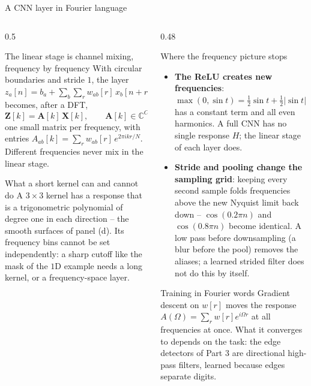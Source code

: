\documentclass[10pt,aspectratio=169]{beamer}
\begin{document}
\begin{frame}{A CNN layer in Fourier language}
\scriptsize
\begin{columns}[T]
\begin{column}{0.5\textwidth}
\begin{block}{The linear stage is channel mixing, frequency by frequency}
With circular boundaries and stride $1$, the layer
$z_a[n]=b_a+\sum_b\sum_rw_{ab}[r]\,x_b[n+r]$ becomes, after a DFT,
\[
  \bm{Z}[k]=\bm{A}[k]\,\bm{X}[k],\qquad
  \bm{A}[k]\in\mathbb{C}^{C_{\mathrm{out}}\times C_{\mathrm{in}}},
\]
one small matrix per frequency, with entries
$A_{ab}[k]=\sum_rw_{ab}[r]\,e^{2\pi ikr/N}$.  Different frequencies never
mix in the linear stage.
\end{block}
\begin{block}{What a short kernel can and cannot do}
A $3\times3$ kernel has a response that is a trigonometric polynomial of
degree one in each direction -- the smooth surfaces of panel (d).  Its
frequency bins cannot be set independently: a sharp cutoff like the mask
of the $1$D example needs a long kernel, or a frequency-space layer.
\end{block}
\end{column}
\begin{column}{0.48\textwidth}
\begin{block}{Where the frequency picture stops}
\begin{itemize}
  \item \textbf{The ReLU creates new frequencies}:
        $\max(0,\sin t)=\tfrac12\sin t+\tfrac12|\sin t|$ has a constant
        term and all even harmonics.  A full CNN has no single response
        $H$; the linear stage of each layer does.
  \item \textbf{Stride and pooling change the sampling grid}: keeping
        every second sample folds frequencies above the new Nyquist limit
        back down -- $\cos(0.2\pi n)$ and $\cos(0.8\pi n)$ become
        identical.  A low pass before downsampling (a blur before the
        pool) removes the aliases; a learned strided filter does not do
        this by itself.
\end{itemize}
\end{block}
\begin{block}{Training in Fourier words}
Gradient descent on $w[r]$ moves the response
$A(\Omega)=\sum_rw[r]e^{i\Omega r}$ at all frequencies at once.  What it
converges to depends on the task: the edge detectors of Part 3 are
directional high-pass filters, learned because edges separate digits.
\end{block}
\end{column}
\end{columns}
\end{frame}
\end{document}
